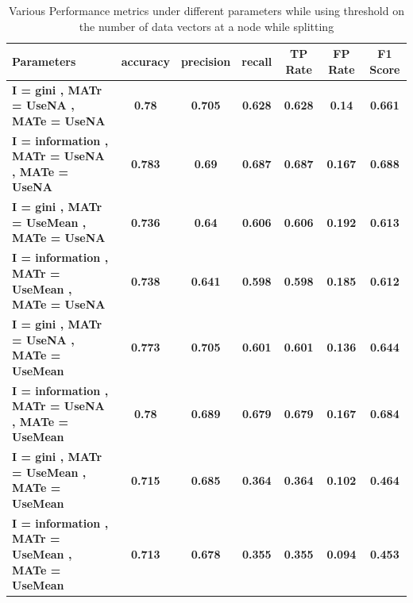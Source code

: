 \documentclass[12pt]{article}%
\begin{document}
\begin{center}
\begin{table}
\centering
\label{table:prune}
\caption{Various Performance metrics under different parameters while using threshold on the number of data vectors at a node while splitting}
\begin{tabular}{|p{2in}|c|c|c|c|c|c|}
 \hline
 {\bf Parameters } & {\bf accuracy } & {\bf precision } & {\bf recall } & {\bf TP Rate } & {\bf FP Rate } & {\bf F1 Score } \\ \hline
 {\bf I = gini , MATr = UseNA , MATe = UseNA  } & {\bf 0.78 } & {\bf 0.705 } & {\bf 0.628 } & {\bf 0.628 } & {\bf 0.14 } & {\bf 0.661 } \\ \hline
 {\bf I = information , MATr = UseNA , MATe = UseNA  } & {\bf 0.783 } & {\bf 0.69 } & {\bf 0.687 } & {\bf 0.687 } & {\bf 0.167 } & {\bf 0.688 } \\ \hline
 {\bf I = gini , MATr = UseMean , MATe = UseNA  } & {\bf 0.736 } & {\bf 0.64 } & {\bf 0.606 } & {\bf 0.606 } & {\bf 0.192 } & {\bf 0.613 } \\ \hline
 {\bf I = information , MATr = UseMean , MATe = UseNA  } & {\bf 0.738 } & {\bf 0.641 } & {\bf 0.598 } & {\bf 0.598 } & {\bf 0.185 } & {\bf 0.612 } \\ \hline
{\bf I = gini , MATr = UseNA , MATe = UseMean  } & {\bf 0.773 } & {\bf 0.705 } & {\bf 0.601 } & {\bf 0.601 } & {\bf 0.136 } & {\bf 0.644 } \\ \hline
{\bf I = information , MATr = UseNA , MATe = UseMean  } & {\bf 0.78 } & {\bf 0.689 } & {\bf 0.679 } & {\bf 0.679 } & {\bf 0.167 } & {\bf 0.684 } \\ \hline
{\bf I = gini , MATr = UseMean , MATe = UseMean  } & {\bf 0.715 } & {\bf 0.685 } & {\bf 0.364 } & {\bf 0.364 } & {\bf 0.102 } & {\bf 0.464 } \\ \hline
{\bf I = information , MATr = UseMean , MATe = UseMean  } & {\bf 0.713 } & {\bf 0.678 } & {\bf 0.355 } & {\bf 0.355 } & {\bf 0.094 } & {\bf 0.453 } \\ \hline

\end{tabular}
\end{table}
\end{center}
\end{document}

